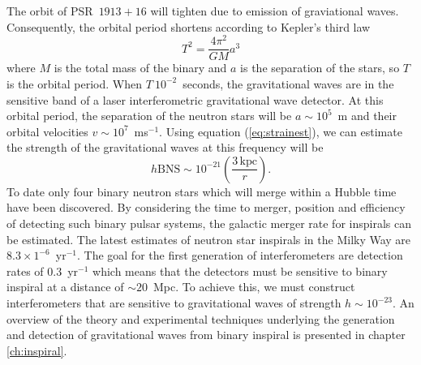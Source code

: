 The orbit of PSR~$1913+16$ will tighten due to emission of graviational waves.
Consequently, the orbital period shortens according to Kepler's third law
\begin{equation}
T^2 = \frac{4\pi^2}{GM}a^3
\end{equation}
where $M$ is the total mass of the binary and $a$ is the separation of the
stars, so $T$ is the orbital period. When $T~10^{-2}$~seconds, the
gravitational waves are in the sensitive band of a laser interferometric
gravitational wave detector.  At this orbital period, the separation of the
neutron stars will be $a \sim 10^5$~m and their orbital velocities
$v \sim 10^7$~ms$^{-1}$. Using equation (\ref{eq:strainest}), we
can estimate the strength of the gravitational waves at this frequency
will be
\begin{equation}
h\mathrm{BNS} \sim 10^{-21}\left( \frac{3\,\mathrm{kpc}}{r} \right).
\label{eq:hbns}
\end{equation}
To date only four binary neutron stars which will
merge within a Hubble time have been discovered.  By considering the
time to merger, position and efficiency of detecting such binary pulsar systems,
the galactic merger rate for inspirals can be estimated\cite{Phinney:1991ei}.
The latest estimates of neutron star inspirals in the Milky Way are $8.3
\times 1^{-6}$~yr$^{-1}$. The goal for the first generation of interferometers
are detection rates of $0.3$~yr$^{-1}$ which means that the detectors must be
sensitive to binary inspiral at a distance of $\sim 20$~Mpc. To achieve this, we
must construct interferometers that are sensitive to gravitational waves of
strength $h \sim 10^{-23}$. An overview of the theory and experimental
techniques underlying the generation and detection of gravitational waves from
binary inspiral is presented in chapter \ref{ch:inspiral}.

